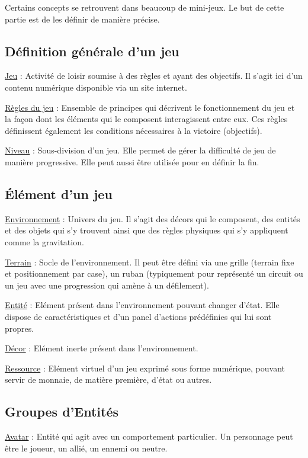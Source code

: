 Certains concepts se retrouvent dans beaucoup de mini-jeux. Le but de cette partie est de les définir de manière précise.

\subsection*{Définition générale d'un jeu}

\underline{Jeu} : 
Activité de loisir soumise à des règles et ayant des objectifs. Il s'agit ici d'un contenu numérique
 disponible via un site internet.

\underline{Règles du jeu} : 
Ensemble de principes qui décrivent le fonctionnement du jeu et 
la façon dont les éléments qui le composent interagissent entre eux. 
Ces règles définissent également les conditions nécessaires à la victoire (objectifs).

\underline{Niveau} :
Sous-division d'un jeu. Elle permet de gérer la difficulté de jeu de manière progressive. Elle peut aussi être utilisée pour en définir la fin. 

\subsection*{Élément d'un jeu}

\underline{Environnement} : 
Univers du jeu. Il s'agit des décors qui le composent, des entités et des objets qui s'y trouvent ainsi que 
des règles physiques qui s'y appliquent comme la gravitation.

\underline{Terrain} : 
Socle de l'environnement. Il peut être défini via une grille (terrain fixe et positionnement par case), un ruban
(typiquement pour représenté un circuit ou un jeu avec une progression qui amène à un défilement). 

\underline{Entité} : 
Elément présent dans l'environnement pouvant changer d'état. 
Elle dispose de caractéristiques et d'un panel d'actions prédéfinies qui lui sont propres.

\underline{Décor} : 
Elément inerte présent dans l'environnement.

\underline{Ressource} : 
Elément virtuel d'un jeu exprimé sous forme numérique, pouvant servir de monnaie, de matière première, d'état ou autres.

\subsection*{Groupes d'Entités}

\underline{Avatar} :
Entité qui agit avec un comportement particulier. Un personnage peut être le joueur, un allié, un ennemi ou neutre.

